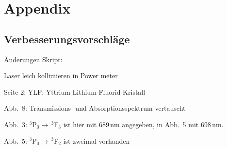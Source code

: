 \section{Appendix}

\subsection{Verbesserungsvorschläge}

Änderungen Skript:

Laser leich kollimieren in Power meter

Seite 2: YLF: Yttrium-Lithium-Fluorid-Kristall

Abb.~8: Transmissions- und Absorptionsspektrum vertauscht

Abb.~3: $^3$P$_0 \rightarrow\,^3$F$_3$ ist hier mit 689\,nm angegeben, in Abb.~5 mit 698\,nm.

Abb.~5: $^3$P$_0 \rightarrow\,^3$F$_2$ ist zweimal vorhanden